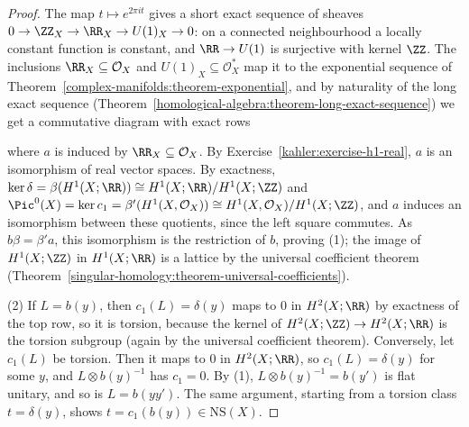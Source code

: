 \begin{proof}
The map $t \mapsto e^{2\pi it}$ gives a short exact sequence of sheaves $0 \to \ZZ_X \to \RR_X \to U(1)_X \to 0$: on a connected neighbourhood a locally constant function is constant, and $\RR \to U(1)$ is
surjective with kernel $\ZZ$. The inclusions $\RR_X \subseteq \mathcal{O}_X$ and $U(1)_X \subseteq \mathcal{O}_X^*$ map it to the exponential sequence of
Theorem~\ref{complex-manifolds:theorem-exponential}, and by naturality of the long exact sequence (Theorem~\ref{homological-algebra:theorem-long-exact-sequence}) we get a commutative diagram with exact rows
\begin{center}
\end{center}
where $a$ is induced by $\RR_X \subseteq \mathcal{O}_X$. By Exercise~\ref{kahler:exercise-h1-real}, $a$ is an isomorphism of real vector spaces. By exactness,
$\ker\delta = \beta(H^1(X; \RR)) \cong H^1(X; \RR)/H^1(X; \ZZ)$ and $\Pic^0(X) = \ker c_1 = \beta'(H^1(X, \mathcal{O}_X)) \cong H^1(X, \mathcal{O}_X)/H^1(X; \ZZ)$, and $a$ induces an isomorphism between these
quotients, since the left square commutes. As $b\beta = \beta'a$, this isomorphism is the restriction of $b$, proving (1); the image of $H^1(X; \ZZ)$ in $H^1(X; \RR)$ is a lattice by the universal coefficient
theorem (Theorem~\ref{singular-homology:theorem-universal-coefficients}).

(2) If $L = b(y)$, then $c_1(L) = \delta(y)$ maps to $0$ in $H^2(X; \RR)$ by exactness of the top row, so it is torsion, because the kernel of $H^2(X; \ZZ) \to H^2(X; \RR)$ is the torsion subgroup (again by
the universal coefficient theorem). Conversely, let $c_1(L)$ be torsion. Then it maps to $0$ in $H^2(X; \RR)$, so $c_1(L) = \delta(y)$ for some $y$, and $L \otimes b(y)^{-1}$ has $c_1 = 0$. By (1),
$L \otimes b(y)^{-1} = b(y')$ is flat unitary, and so is $L = b(yy')$. The same argument, starting from a torsion class $t = \delta(y)$, shows $t = c_1(b(y)) \in \mathrm{NS}(X)$.
\end{proof}

